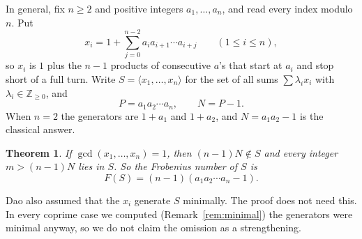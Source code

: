 \documentclass[11pt]{amsart}
\newtheorem{theorem}{Theorem}
\theoremstyle{remark}
\begin{document}
In general, fix $n\ge2$ and positive integers $a_1,\dots,a_n$, and read every index modulo $n$. Put
\[
x_i=1+\sum_{j=0}^{n-2}a_ia_{i+1}\cdots a_{i+j}\qquad(1\le i\le n),
\]
so $x_i$ is $1$ plus the $n-1$ products of consecutive $a$'s that start at $a_i$ and stop short of a full turn. Write $S=\langle x_1,\dots,x_n\rangle$ for the set of all sums $\sum\lambda_ix_i$ with $\lambda_i\in\mathbb Z_{\ge0}$, and
\[
P=a_1a_2\cdots a_n,\qquad N=P-1 .
\]
When $n=2$ the generators are $1+a_1$ and $1+a_2$, and $N=a_1a_2-1$ is the classical answer.

\begin{theorem}\label{thm:main}
If $\gcd(x_1,\dots,x_n)=1$, then $(n-1)N\notin S$ and every integer $m>(n-1)N$ lies in $S$. So the Frobenius number of $S$ is
\[
F(S)=(n-1)(a_1a_2\cdots a_n-1).
\]
\end{theorem}

Dao also assumed that the $x_i$ generate $S$ minimally. The proof does not need this. In every coprime case we computed (Remark~\ref{rem:minimal}) the generators were minimal anyway, so we do not claim the omission as a strengthening.
\end{document}
